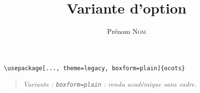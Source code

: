 \documentclass[11pt]{ocots-book}
\title{Variante d'option}
\author{Prénom \textsc{Nom}}
\newcommand{\ocotsvariantnote}[1]{\begin{quote}\itshape Variante : #1\end{quote}}
\begin{document}
\maketitle
\begin{lstlisting}
\usepackage[..., theme=legacy, boxform=plain]{ocots}
\end{lstlisting}
\ocotsvariantnote{\texttt{boxform=plain} : rendu académique sans cadre.}

\end{document}
